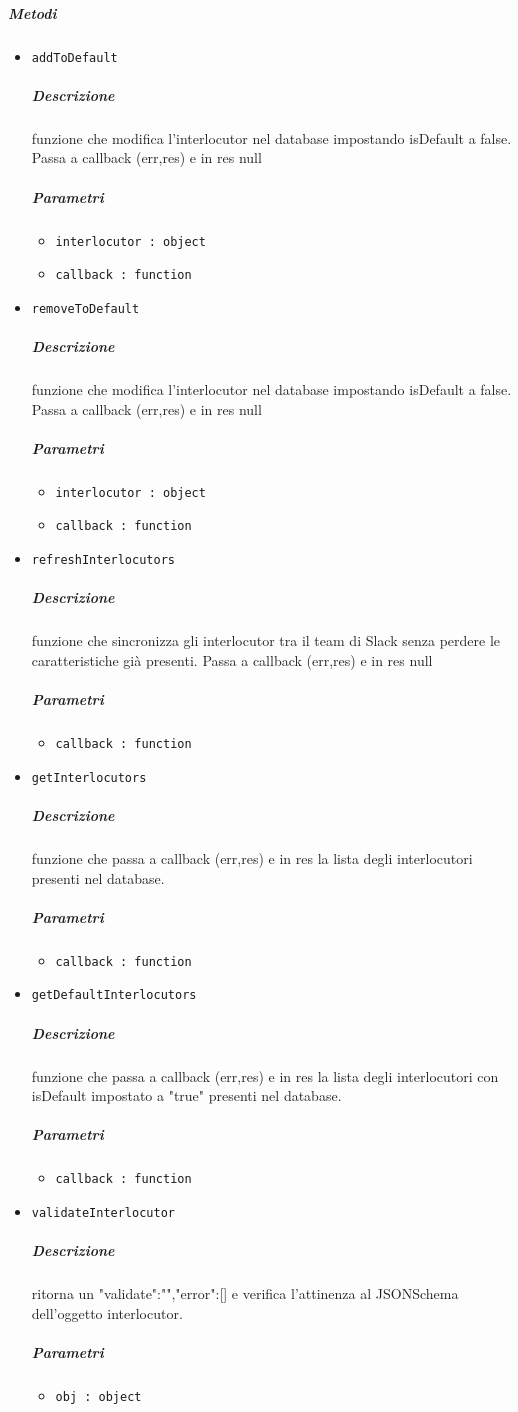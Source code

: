 \documentclass[../ManualeSviluppatore_v1.0.0.tex]{subfiles}
\begin{document}
\subparagraph{Metodi}\begin{itemize}
\item \texttt{addToDefault}
\subparagraph{Descrizione} funzione che modifica l'interlocutor nel database impostando isDefault a false. Passa a callback (err,res) e in res null
\subparagraph{Parametri} \begin{itemize}
\item \texttt{interlocutor : object}
\item \texttt{callback : function}
\end{itemize}
\item \texttt{removeToDefault}
\subparagraph{Descrizione} funzione che modifica l'interlocutor nel database impostando isDefault a false. Passa a callback (err,res) e in res null
\subparagraph{Parametri} \begin{itemize}
\item \texttt{interlocutor : object}
\item \texttt{callback : function}
\end{itemize}
\item \texttt{refreshInterlocutors}
\subparagraph{Descrizione} funzione che sincronizza gli interlocutor tra il team di Slack senza perdere le caratteristiche già presenti. Passa a callback (err,res) e in res null
\subparagraph{Parametri} \begin{itemize}
\item \texttt{callback : function}
\end{itemize}
\item \texttt{getInterlocutors}
\subparagraph{Descrizione} funzione che passa a callback (err,res) e in res la lista degli interlocutori presenti nel database.
\subparagraph{Parametri} \begin{itemize}
\item \texttt{callback : function}
\end{itemize}
\item \texttt{getDefaultInterlocutors}
\subparagraph{Descrizione} funzione che passa a callback (err,res) e in res la lista degli interlocutori con isDefault impostato a "true" presenti nel database.
\subparagraph{Parametri} \begin{itemize}
\item \texttt{callback : function}
\end{itemize}
\item \texttt{validateInterlocutor}
\subparagraph{Descrizione} ritorna un {"validate":"","error":[]} e verifica l'attinenza al JSONSchema dell'oggetto interlocutor.
\subparagraph{Parametri} \begin{itemize}
\item \texttt{obj : object}
\end{itemize}
\end{itemize}
\end{document}
